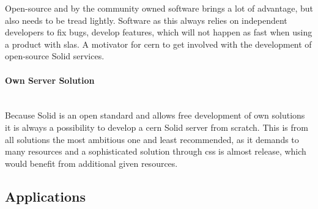 Open-source and by the community owned software brings a lot of advantage, but also needs to be tread lightly. Software as this always relies on independent developers to fix bugs, develop features, which will not happen as fast when using a product with \glspl{sla}. A motivator for \gls{cern} to get involved with the development of open-source Solid services.
\vspace{0.5cm}
\paragraph{Own Server Solution}\mbox{}\\

Because Solid is an open standard and allows free development of own solutions it is always a possibility to develop a \gls{cern} Solid server from scratch. This is from all solutions the most ambitious one and least recommended, as it demands to many resources and a sophisticated solution through \gls{css} is almost release, which would benefit from additional given resources.

\subsection{Applications}
